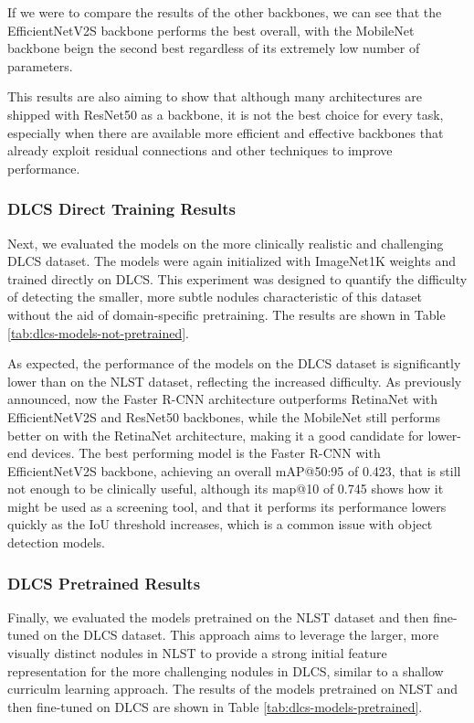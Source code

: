 If we were to compare the results of the other backbones, we can see that the EfficientNetV2S backbone performs the best overall, with the MobileNet backbone beign the second best regardless of its extremely low number of parameters.

This results are also aiming to show that although many architectures are shipped with ResNet50 as a backbone, it is not the best choice for every task, especially when there are available more efficient and effective backbones that already exploit residual connections and other techniques to improve performance.

\subsubsection{DLCS Direct Training Results}
Next, we evaluated the models on the more clinically realistic and challenging DLCS dataset. The models were again initialized with ImageNet1K weights and trained directly on DLCS. This experiment was designed to quantify the difficulty of detecting the smaller, more subtle nodules characteristic of this dataset without the aid of domain-specific pretraining. The results are shown in Table \ref{tab:dlcs-models-not-pretrained}.



As expected, the performance of the models on the DLCS dataset is significantly lower than on the NLST dataset, reflecting the increased difficulty. As previously announced, now the Faster R-CNN architecture outperforms RetinaNet with EfficientNetV2S and ResNet50 backbones, while the MobileNet still performs better on with the RetinaNet architecture, making it a good candidate for lower-end devices.
The best performing model is the Faster R-CNN with EfficientNetV2S backbone, achieving an overall mAP@50:95 of 0.423, that is still not enough to be clinically useful, although its map@10 of 0.745 shows how it might be used as a screening tool, and that it performs its performance lowers quickly as the IoU threshold increases, which is a common issue with object detection models.

\subsubsection{DLCS Pretrained Results}
Finally, we evaluated the models pretrained on the NLST dataset and then fine-tuned on the DLCS dataset. This approach aims to leverage the larger, more visually distinct nodules in NLST to provide a strong initial feature representation for the more challenging nodules in DLCS, similar to a shallow curriculm learning approach.
The results of the models pretrained on NLST and then fine-tuned on DLCS are shown in Table \ref{tab:dlcs-models-pretrained}.

